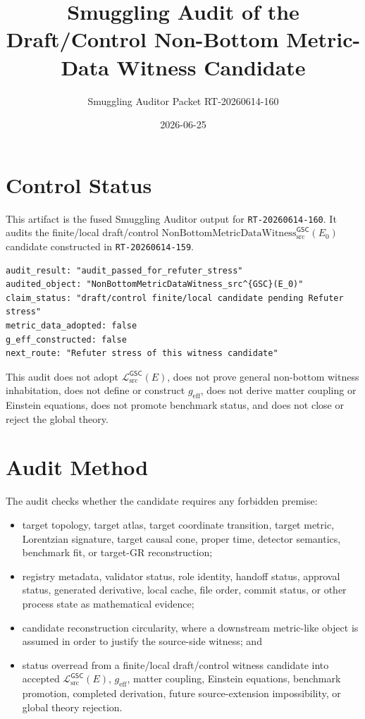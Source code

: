 \documentclass[11pt]{article}
\title{Smuggling Audit of the Draft/Control Non-Bottom Metric-Data Witness Candidate}
\author{Smuggling Auditor Packet RT-20260614-160}
\date{2026-06-25}
\newcommand{\Witness}{\mathrm{NonBottomMetricDataWitness}_{\mathrm{src}}^{\mathsf{GSC}}}
\newcommand{\MetricData}{\mathcal{L}_{\mathrm{src}}^{\mathsf{GSC}}}
\newcommand{\geff}{g_{\mathrm{eff}}}
\newcommand{\Ezero}{E_{0}}
\begin{document}
\maketitle

\section{Control Status}

This artifact is the fused Smuggling Auditor output for
\texttt{RT-20260614-160}. It audits the finite/local draft/control
\(\Witness(\Ezero)\) candidate constructed in \texttt{RT-20260614-159}.

\begin{verbatim}
audit_result: "audit_passed_for_refuter_stress"
audited_object: "NonBottomMetricDataWitness_src^{GSC}(E_0)"
claim_status: "draft/control finite/local candidate pending Refuter stress"
metric_data_adopted: false
g_eff_constructed: false
next_route: "Refuter stress of this witness candidate"
\end{verbatim}

This audit does not adopt \(\MetricData(E)\), does not prove general
non-bottom witness inhabitation, does not define or construct \(\geff\), does
not derive matter coupling or Einstein equations, does not promote benchmark
status, and does not close or reject the global theory.

\section{Audit Method}

The audit checks whether the candidate requires any forbidden premise:
\begin{itemize}[leftmargin=*]
  \item target topology, target atlas, target coordinate transition, target
  metric, Lorentzian signature, target causal cone, proper time, detector
  semantics, benchmark fit, or target-GR reconstruction;
  \item registry metadata, validator status, role identity, handoff status,
  approval status, generated derivative, local cache, file order, commit
  status, or other process state as mathematical evidence;
  \item candidate reconstruction circularity, where a downstream metric-like
  object is assumed in order to justify the source-side witness; and
  \item status overread from a finite/local draft/control witness candidate
  into accepted \(\MetricData(E)\), \(\geff\), matter coupling, Einstein
  equations, benchmark promotion, completed derivation, future
  source-extension impossibility, or global theory rejection.
\end{itemize}
\end{document}
